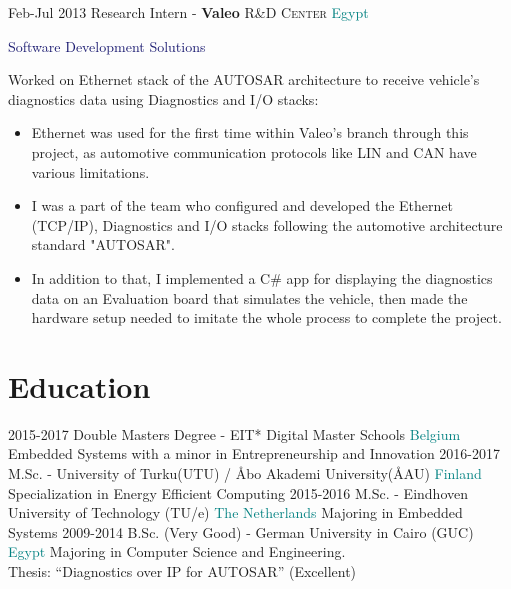 \documentclass[letterpaper]{twentysecondcv}
\begin{document}
\begin{twenty}
  \twentyitem
    {\small{Feb-Jul} 2013}
    {Research Intern - \textbf{Valeo} \textsc{R\&D Center} }
    {\textcolor{teal}{Egypt}}
    {\small{\textcolor{MidnightBlue}{ Software Development Solutions}}\\
    \small{Worked on Ethernet stack of the AUTOSAR architecture to receive vehicle's diagnostics data using Diagnostics and I/O stacks:
    \footnotesize{
    \begin{itemize}
    \setlength\itemsep{0em}
	\item Ethernet was used for the first time within Valeo's branch through this project, as automotive communication protocols like LIN and CAN have various limitations.
    
	\item I was a part of the team who configured and developed the Ethernet (TCP/IP), Diagnostics and I/O stacks following the automotive architecture standard "AUTOSAR".

	\item In addition to that, I implemented a C\# app for displaying the diagnostics data on an Evaluation board that simulates the vehicle, then made the hardware setup needed to imitate the whole process to complete the project.
    \end{itemize}
}}}
\end{twenty}

\section{Education}

\begin{twenty}
  \twentyitem
    {2015-2017}
    {Double Masters Degree {\normalfont - EIT* Digital Master Schools}}
    {\textcolor{teal}{Belgium}}
    {Embedded Systems with a minor in Entrepreneurship and Innovation}
  \twentyitem
    {\hspace{0.2cm} 2016-2017}
    {\hspace{0.1cm} M.Sc. {\normalfont - University of Turku(UTU) / \r{A}bo Akademi University(\r{A}AU)}}
    {\textcolor{teal}{Finland}}
    {Specialization in Energy Efficient Computing}
  \twentyitem
    {\hspace{0.2cm} 2015-2016}
    {\hspace{0.1cm} M.Sc. {\normalfont - Eindhoven University of Technology (TU/e)}}
    {\textcolor{teal}{The Netherlands}}
    {Majoring in Embedded Systems}
  \twentyitem
    {2009-2014}
    {B.Sc. (Very Good) - German University in Cairo (GUC) }
    {\textcolor{teal}{Egypt}}
    {Majoring in Computer Science and Engineering. \\
    \textcolor{NavyBlue} {\footnotesize Thesis: ``Diagnostics over IP for AUTOSAR'' (Excellent)  }}
    
\end{twenty}
\end{document}
